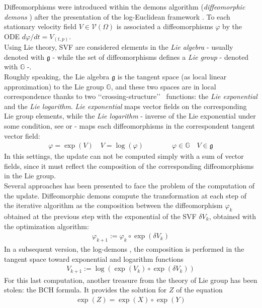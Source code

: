 Diffeomorphisms were introduced within the demons algorithm (\emph{diffeomorphic demons} \cite{vercauteren2006robust}) after the presentation of the log-Euclidean framework \cite{Arsigny:MRM:06}. 
To each stationary velocity field $V \in \mathcal{V}(\Omega)$ is associated a diffeomorphisms $\varphi$ by the ODE $d\varphi /dt = V_{(t,p)} $.\\
Using Lie theory, SVF are considered elements in the \emph{Lie algebra} - usually denoted with $\mathfrak{g}$ - while the set of diffeomorphisms defines a \emph{Lie group} - denoted with $\mathbb{G}$ -.\\

Roughly speaking, the Lie algebra $\mathfrak{g}$ is the tangent space (as local linear approximation) to the Lie group $\mathbb{G}$, and these two spaces are in local correspondence thanks to two \lq\lq crossing-structure\rq\rq~ functions: the \emph{Lie exponential} and the \emph{Lie logarithm}. \emph{Lie exponential} maps vector fields on the corresponding Lie group elements, while the \emph{Lie logarithm} - inverse of the Lie exponential under some condition, see \cite{do1976differential} or \cite{lee2012introduction} - maps each diffeomorphisms in the correspondent tangent vector field:
\begin{align*}
\varphi = \exp(V)  
\quad
V = \log(\varphi ) 
\qquad \qquad
\varphi  \in \mathbb{G}
\quad
V \in \mathfrak{g}
\end{align*}
In this settings, the update can not be computed simply with a sum of vector fields, since it must reflect the composition of the corresponding diffeomorphisms in the Lie group.\\


Several approaches has been presented to face the problem of the computation of the update. Diffeomorphic demons compute the transformation at each step of the iterative algorithm as the composition between the diffeomorphism $\varphi_{k}$ obtained at the previous step with the exponential of the SVF $\delta V_{k}$, obtained with the optimization algorithm:
\begin{align*}
\varphi_{k + 1} := \varphi_{k}  \circ \exp(\delta V_{k})
\end{align*}
In a subsequent version, the log-demons \cite{vercauteren08}, the composition is performed in the tangent space toward exponential and logarithm functions
\begin{align}\label{eq:bch_problem}
V_{k + 1} := \log( \exp(V_{k})  \circ \exp(\delta V_{k}))
\end{align}
For this last computation, another treasure from the theory of Lie group has been stolen: the BCH formula. It provides the solution for $Z$ of the equation 
\begin{align*}
 \exp(Z) = \exp(X)\circ\exp(Y)
\end{align*}

